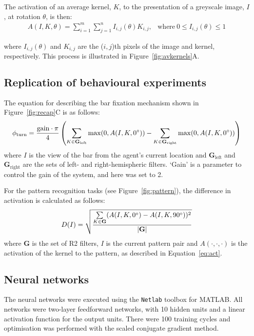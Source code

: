\documentclass[10pt]{article}
\newcommand{\Matlab}{MATLAB}
\begin{document}
The activation of an average kernel, $K$, to the presentation of a greyscale image, $I$, at rotation $\theta$, is then:
\begin{equation}
\label{eq:act}
\begin{array}{rl}
A(I,K,\theta) = {\sum\limits^m_{i=1} \sum\limits^n_{j=1} I_{i,j}(\theta)K_{i,j}}, &\mathrm{where\ } 0 \le I_{i,j}(\theta) \le 1
\end{array}
\end{equation}

where $I_{i,j}(\theta)$ and $K_{i,j}$ are the ($i,j$)th pixels of the image and kernel, respectively. This process is illustrated in Figure~\ref{fig:avkernels}A.

\subsection*{Replication of behavioural experiments}
\label{sec:methods:replication}
The equation for describing the bar fixation mechanism shown in Figure~\ref{fig:recap}C is as follows:
$$
\phi_\mathrm{turn} = \frac{\mathrm{gain}\cdot \pi}{4}\left( \sum\limits_{K\in \mathbf{G}_\mathrm{left}}\max(0,A(I,K,0\degree)) - \sum\limits_{K\in \mathbf{G}_\mathrm{right}}\max(0,A(I,K,0\degree)) \right)
$$
where $I$ is the view of the bar from the agent's current location and $\mathbf{G}_\mathrm{left}$ and $\mathbf{G}_\mathrm{right}$ are the sets of left- and right-hemispheric filters. `Gain' is a parameter to control the gain of the system, and here was set to 2.

For the pattern recognition tasks (see Figure~\ref{fig:pattern}), the difference in activation is calculated as follows:
$$
D(I) = \sqrt{\frac{\sum\limits_{K\in \mathbf{G}}(A(I,K,0\degree)-A(I,K,90\degree))^2}{|\mathbf{G}|}}
$$
where $\mathbf{G}$ is the set of R2 filters, $I$ is the current pattern pair and $A(\cdot,\cdot,\cdot)$ is the activation of the kernel to the pattern, as described in Equation~\ref{eq:act}.

\subsection*{Neural networks}
\label{sec:methods:neuralnetworks}
The neural networks were executed using the \texttt{Netlab} toolbox for \Matlab.
All networks were two-layer feedforward networks, with 10 hidden units and a linear activation function for the output units.
There were 100 training cycles and optimisation was performed with the scaled conjugate gradient method.
\end{document}
